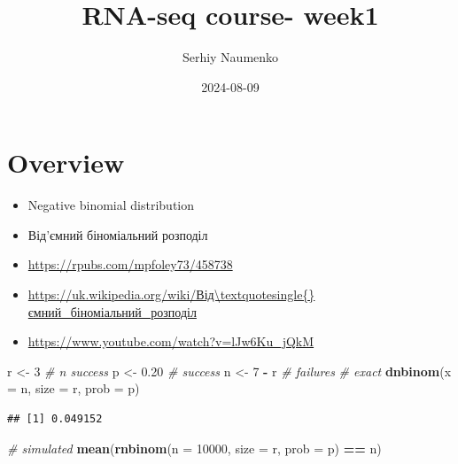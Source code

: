 \documentclass[
  10pt,
]{article}
\title{RNA-seq course- week1}
\author{Serhiy Naumenko}
\date{2024-08-09}
\newenvironment{Shaded}{\begin{snugshade}}{\end{snugshade}}
\newcommand{\AttributeTok}[1]{\textcolor[rgb]{0.13,0.29,0.53}{#1}}
\newcommand{\CommentTok}[1]{\textcolor[rgb]{0.56,0.35,0.01}{\textit{#1}}}
\newcommand{\DecValTok}[1]{\textcolor[rgb]{0.00,0.00,0.81}{#1}}
\newcommand{\FloatTok}[1]{\textcolor[rgb]{0.00,0.00,0.81}{#1}}
\newcommand{\FunctionTok}[1]{\textcolor[rgb]{0.13,0.29,0.53}{\textbf{#1}}}
\newcommand{\NormalTok}[1]{#1}
\newcommand{\OtherTok}[1]{\textcolor[rgb]{0.56,0.35,0.01}{#1}}
\newcommand{\SpecialCharTok}[1]{\textcolor[rgb]{0.81,0.36,0.00}{\textbf{#1}}}
\providecommand{\tightlist}{%
  \setlength{\itemsep}{0pt}\setlength{\parskip}{0pt}}
\begin{document}
\maketitle

{
\hypersetup{linkcolor=}
\setcounter{tocdepth}{2}
\tableofcontents
}
\hypertarget{overview}{%
\section{Overview}\label{overview}}

\begin{itemize}
\tightlist
\item
  Negative binomial distribution
\item
  Від'ємний біноміальний розподіл
\item
  \url{https://rpubs.com/mpfoley73/458738}
\item
  \url{https://uk.wikipedia.org/wiki/Від\textquotesingle{}ємний_біноміальний_розподіл}
\item
  \url{https://www.youtube.com/watch?v=lJw6Ku_jQkM}
\end{itemize}

\newpage

\begin{Shaded}
\begin{Highlighting}[]
\NormalTok{r }\OtherTok{\textless{}{-}}  \DecValTok{3} \CommentTok{\# n success}
\NormalTok{p }\OtherTok{\textless{}{-}}  \FloatTok{0.20} \CommentTok{\# success}
\NormalTok{n }\OtherTok{\textless{}{-}}  \DecValTok{7} \SpecialCharTok{{-}}\NormalTok{ r }\CommentTok{\# failures}
\CommentTok{\# exact}
\FunctionTok{dnbinom}\NormalTok{(}\AttributeTok{x =}\NormalTok{ n, }\AttributeTok{size =}\NormalTok{ r, }\AttributeTok{prob =}\NormalTok{ p)}
\end{Highlighting}
\end{Shaded}

\begin{verbatim}
## [1] 0.049152
\end{verbatim}

\begin{Shaded}
\begin{Highlighting}[]
\CommentTok{\# simulated}
\FunctionTok{mean}\NormalTok{(}\FunctionTok{rnbinom}\NormalTok{(}\AttributeTok{n =} \DecValTok{10000}\NormalTok{, }\AttributeTok{size =}\NormalTok{ r, }\AttributeTok{prob =}\NormalTok{ p) }\SpecialCharTok{==}\NormalTok{ n)}
\end{Highlighting}
\end{Shaded}
\end{document}
